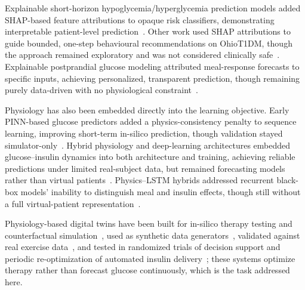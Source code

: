 \documentclass[journal]{IEEEtran}
\begin{document}
Explainable short-horizon hypoglycemia/hyperglycemia prediction models added SHAP-based feature attributions to opaque risk classifiers, demonstrating interpretable patient-level prediction~\cite{ref3}. Other work used SHAP attributions to guide bounded, one-step behavioural recommendations on OhioT1DM, though the approach remained exploratory and was not considered clinically safe~\cite{ref6}. Explainable postprandial glucose modeling attributed meal-response forecasts to specific inputs, achieving personalized, transparent prediction, though remaining purely data-driven with no physiological constraint~\cite{ref7}.

Physiology has also been embedded directly into the learning objective. Early PINN-based glucose predictors added a physics-consistency penalty to sequence learning, improving short-term in-silico prediction, though validation stayed simulator-only~\cite{ref9}. Hybrid physiology and deep-learning architectures embedded glucose--insulin dynamics into both architecture and training, achieving reliable predictions under limited real-subject data, but remained forecasting models rather than virtual patients~\cite{ref11}. Physics--LSTM hybrids addressed recurrent black-box models' inability to distinguish meal and insulin effects, though still without a full virtual-patient representation~\cite{ref12}.

Physiology-based digital twins have been built for in-silico therapy testing and counterfactual simulation~\cite{ref13,ref14}, used as synthetic data generators~\cite{ref15}, validated against real exercise data~\cite{ref16}, and tested in randomized trials of decision support and periodic re-optimization of automated insulin delivery~\cite{ref17,ref18}; these systems optimize therapy rather than forecast glucose continuously, which is the task addressed here.
\end{document}
